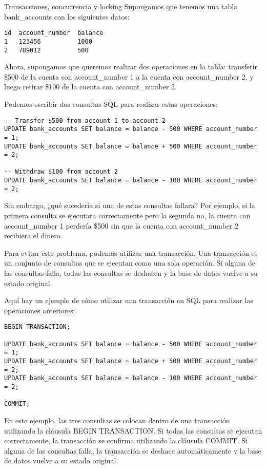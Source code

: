 \begin{frame}[fragile]{Transacciones, concurrencia y locking}
\protect\hypertarget{transacciones-concurrencia-y-locking}{}
Supongamos que tenemos una tabla bank\_accounts con los siguientes
datos:

\begin{verbatim}
id  account_number  balance
1   123456          1000
2   789012          500
\end{verbatim}

Ahora, supongamos que queremos realizar dos operaciones en la tabla:
transferir \$500 de la cuenta con account\_number 1 a la cuenta con
account\_number 2, y luego retirar \$100 de la cuenta con
account\_number 2.

Podemos escribir dos consultas SQL para realizar estas operaciones:

\begin{verbatim}
-- Transfer $500 from account 1 to account 2
UPDATE bank_accounts SET balance = balance - 500 WHERE account_number = 1;
UPDATE bank_accounts SET balance = balance + 500 WHERE account_number = 2;

-- Withdraw $100 from account 2
UPDATE bank_accounts SET balance = balance - 100 WHERE account_number = 2;
\end{verbatim}

Sin embargo, ¿qué sucedería si una de estas consultas fallara? Por
ejemplo, si la primera consulta se ejecutara correctamente pero la
segunda no, la cuenta con account\_number 1 perdería \$500 sin que la
cuenta con account\_number 2 recibiera el dinero.

Para evitar este problema, podemos utilizar una transacción. Una
transacción es un conjunto de consultas que se ejecutan como una sola
operación. Si alguna de las consultas falla, todas las consultas se
deshacen y la base de datos vuelve a su estado original.

Aquí hay un ejemplo de cómo utilizar una transacción en SQL para
realizar las operaciones anteriores:

\begin{verbatim}
BEGIN TRANSACTION;

UPDATE bank_accounts SET balance = balance - 500 WHERE account_number = 1;
UPDATE bank_accounts SET balance = balance + 500 WHERE account_number = 2;
UPDATE bank_accounts SET balance = balance - 100 WHERE account_number = 2;

COMMIT;
\end{verbatim}

En este ejemplo, las tres consultas se colocan dentro de una transacción
utilizando la cláusula BEGIN TRANSACTION. Si todas las consultas se
ejecutan correctamente, la transacción se confirma utilizando la
cláusula COMMIT. Si alguna de las consultas falla, la transacción se
deshace automáticamente y la base de datos vuelve a su estado original.


\end{frame}

